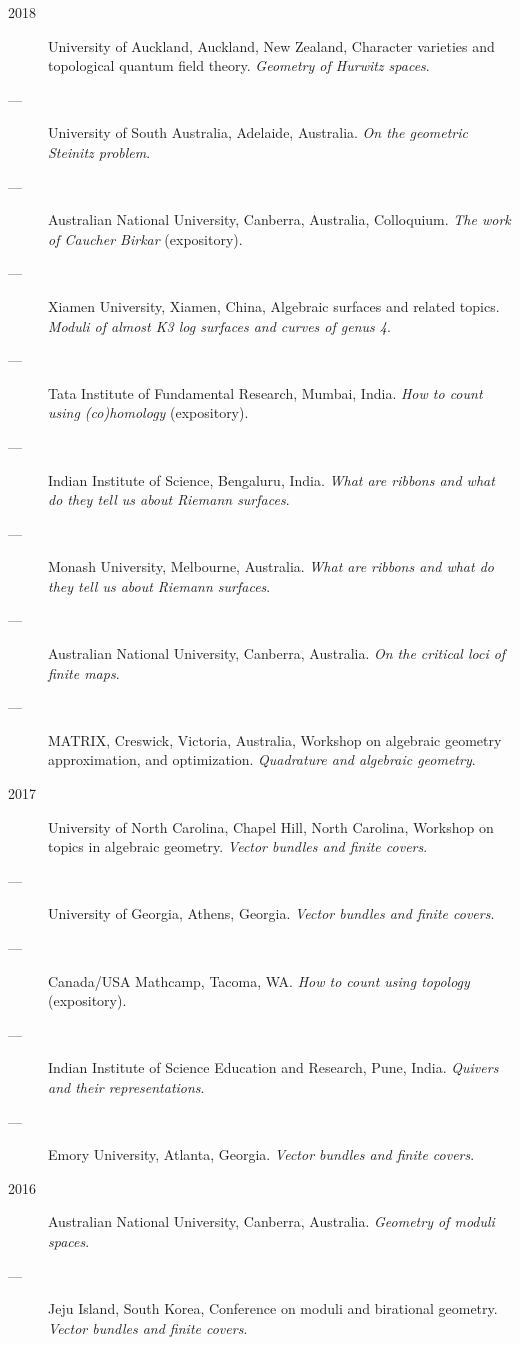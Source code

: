 \documentclass[11pt]{article}
\begin{document}
\begin{description}
\item[{2018}] University of Auckland, Auckland, New Zealand, Character varieties and topological quantum field theory. \emph{Geometry of Hurwitz spaces}.
\item[{---}] University of South Australia, Adelaide, Australia. \emph{On the geometric Steinitz problem}.
\item[{---}] Australian National University, Canberra, Australia, Colloquium. \emph{The work of Caucher Birkar} (expository).
\item[{---}] Xiamen University, Xiamen, China, Algebraic surfaces and related topics. \emph{Moduli of almost K3 log surfaces and curves of genus 4}.
\item[{---}] Tata Institute of Fundamental Research, Mumbai, India. \emph{How to count using (co)homology} (expository).
\item[{---}] Indian Institute of Science, Bengaluru, India. \emph{What are ribbons and what do they tell us about Riemann surfaces}.
\item[{---}] Monash University, Melbourne, Australia. \emph{What are ribbons and what do they tell us about Riemann surfaces}.
\item[{---}] Australian National University, Canberra, Australia. \emph{On the critical loci of finite maps}.
\item[{---}] MATRIX, Creswick, Victoria, Australia, Workshop on algebraic geometry approximation, and optimization. \emph{Quadrature and algebraic geometry}.
\item[{2017}] University of North Carolina, Chapel Hill, North Carolina, Workshop on topics in algebraic geometry. \emph{Vector bundles and finite covers}.
\item[{---}] University of Georgia, Athens, Georgia. \emph{Vector bundles and finite covers}.
\item[{---}] Canada/USA Mathcamp, Tacoma, WA. \emph{How to count using topology} (expository).
\item[{---}] Indian Institute of Science Education and Research, Pune, India. \emph{Quivers and their representations}.
\item[{---}] Emory University, Atlanta, Georgia. \emph{Vector bundles and finite covers}.
\item[{2016}] Australian National University, Canberra, Australia. \emph{Geometry of moduli spaces}.
\item[{---}] Jeju Island, South Korea, Conference on moduli and birational geometry. \emph{Vector bundles and finite covers}.

\end{description}
\end{document}

